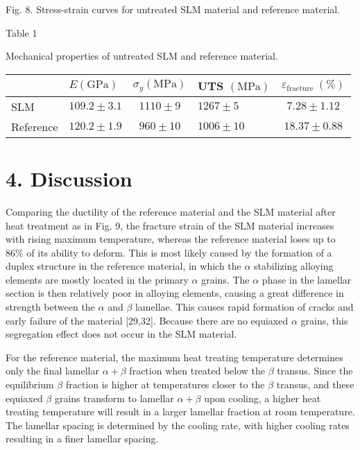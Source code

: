 \documentclass[10pt]{article}
\begin{document}
Fig. 8. Stress-strain curves for untreated SLM material and reference material.

Table 1

Mechanical properties of untreated SLM and reference material.

\begin{center}
\begin{tabular}{llclc}
\hline
 & $E(\mathrm{GPa})$ & $\sigma_{y}(\mathrm{MPa})$ & UTS $(\mathrm{MPa})$ & $\varepsilon_{\text {fracture }}(\%)$ \\
\hline
SLM & $109.2 \pm 3.1$ & $1110 \pm 9$ & $1267 \pm 5$ & $7.28 \pm 1.12$ \\
Reference & $120.2 \pm 1.9$ & $960 \pm 10$ & $1006 \pm 10$ & $18.37 \pm 0.88$ \\
\hline
\end{tabular}
\end{center}

\section*{4. Discussion}
Comparing the ductility of the reference material and the SLM material after heat treatment as in Fig. 9, the fracture strain of the SLM material increases with rising maximum temperature, whereas the reference material loses up to $86 \%$ of its ability to deform. This is most likely caused by the formation of a duplex structure in the reference material, in which the $\alpha$ stabilizing alloying elements are mostly located in the primary $\alpha$ grains. The $\alpha$ phase in the lamellar section is then relatively poor in alloying elements, causing a great difference in strength between the $\alpha$ and $\beta$ lamellae. This causes rapid formation of cracks and early failure of the material [29,32]. Because there are no equiaxed $\alpha$ grains, this segregation effect does not occur in the SLM material.

For the reference material, the maximum heat treating temperature determines only the final lamellar $\alpha+\beta$ fraction when treated below the $\beta$ transus. Since the equilibrium $\beta$ fraction is higher at temperatures closer to the $\beta$ transus, and these equiaxed $\beta$ grains transform to lamellar $\alpha+\beta$ upon cooling, a higher heat treating temperature will result in a larger lamellar fraction at room temperature. The lamellar spacing is determined by the cooling rate, with higher cooling rates resulting in a finer lamellar spacing.
\end{document}
